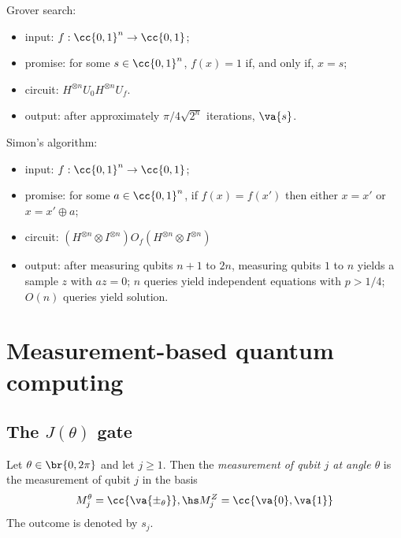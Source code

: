 \documentclass{article}
\begin{document}
\begin{algorithm}
  Grover search:
  \begin{itemize}
    \item input: $f:\cc{0,1}^n\to\cc{0,1}$;
    \item promise: for some $s\in\cc{0,1}^n$, $f(x)=1$ if, and only if,
      $x=s$;
    \item circuit: $H^{\otimes n} U_0 H^{\otimes n} U_f$.
    \item output: after approximately $\pi/4 \sqrt{2^n}$ iterations,
      $\va{s}$.
  \end{itemize}
\end{algorithm}

\begin{algorithm}
  Simon's algorithm:
  \begin{itemize}
    \item input: $f:\cc{0,1}^n\to\cc{0,1}$;
    \item promise: for some $a\in\cc{0,1}^n$, if $f(x) = f(x')$ then
      either $x=x'$ or $x = x' \oplus a$;
    \item circuit:
      $(H^{\otimes n}\otimes I^{\otimes n}) O_f (H^{\otimes n}\otimes I^{\otimes n})$
    \item output: after measuring qubits $n+1$ to $2n$, measuring qubits
      $1$ to $n$ yields a sample $z$ with $az=0$; $n$ queries yield
      independent equations with $p>1/4$; $O(n)$ queries yield solution.
  \end{itemize}
\end{algorithm}

\section{Measurement-based quantum computing}

\subsection{The $J(\theta)$ gate}

\begin{definition}
  Let $\theta\in\br{0,2\pi}$ and let $j\geq 1$. Then the
  \emph{measurement of qubit $j$ at angle $\theta$} is the measurement
  of qubit $j$ in the basis
  \begin{align*}
    M_j^\theta = \cc{\va{\pm_\theta}},\hs
    M_j^Z = \cc{\va{0},\va{1}}
  \end{align*}
  The outcome is denoted by $s_j$.
\end{definition}
\end{document}

